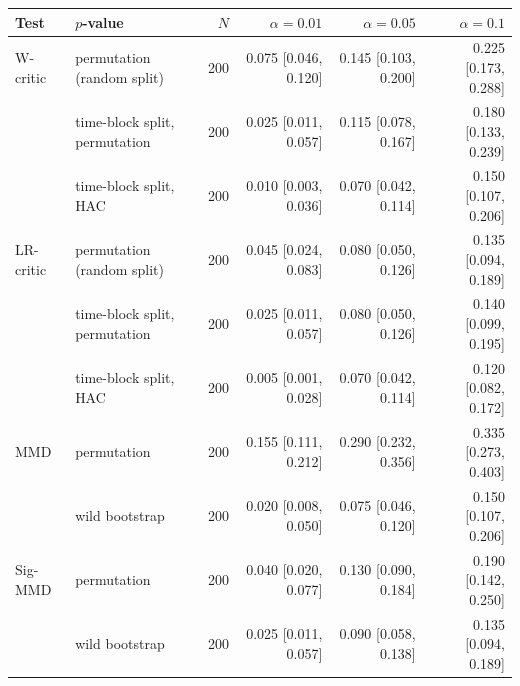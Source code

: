 \begin{tabular}{llrrrr}
\toprule
Test & $p$-value & $N$ & $\alpha=0.01$ & $\alpha=0.05$ & $\alpha=0.1$ \\
\midrule
W-critic & permutation (random split) & 200 & 0.075 [0.046, 0.120] & 0.145 [0.103, 0.200] & 0.225 [0.173, 0.288] \\
 & time-block split, permutation & 200 & 0.025 [0.011, 0.057] & 0.115 [0.078, 0.167] & 0.180 [0.133, 0.239] \\
 & time-block split, HAC & 200 & 0.010 [0.003, 0.036] & 0.070 [0.042, 0.114] & 0.150 [0.107, 0.206] \\
LR-critic & permutation (random split) & 200 & 0.045 [0.024, 0.083] & 0.080 [0.050, 0.126] & 0.135 [0.094, 0.189] \\
 & time-block split, permutation & 200 & 0.025 [0.011, 0.057] & 0.080 [0.050, 0.126] & 0.140 [0.099, 0.195] \\
 & time-block split, HAC & 200 & 0.005 [0.001, 0.028] & 0.070 [0.042, 0.114] & 0.120 [0.082, 0.172] \\
MMD & permutation & 200 & 0.155 [0.111, 0.212] & 0.290 [0.232, 0.356] & 0.335 [0.273, 0.403] \\
 & wild bootstrap & 200 & 0.020 [0.008, 0.050] & 0.075 [0.046, 0.120] & 0.150 [0.107, 0.206] \\
Sig-MMD & permutation & 200 & 0.040 [0.020, 0.077] & 0.130 [0.090, 0.184] & 0.190 [0.142, 0.250] \\
 & wild bootstrap & 200 & 0.025 [0.011, 0.057] & 0.090 [0.058, 0.138] & 0.135 [0.094, 0.189] \\
\bottomrule
\end{tabular}
